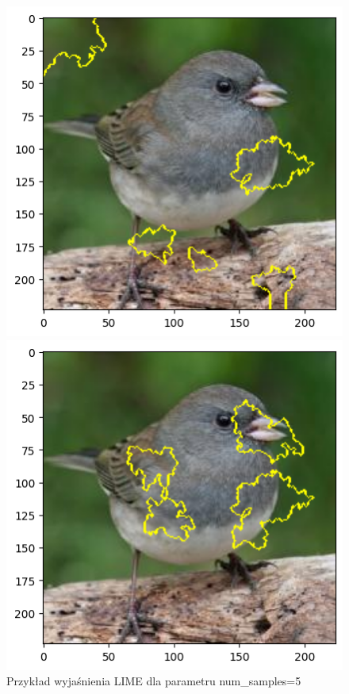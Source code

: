 \begin{figure}
	\centering
	\begin{minipage}[b]{0.3\textwidth}
		\includegraphics[width=.9\textwidth]{img/parameters/lime/num_samples_5}
		\caption{Przykład wyjaśnienia LIME dla parametru num\_samples=5}  \label{rys:parameters_lime_numsamples_5}
	\end{minipage}
	\begin{minipage}[b]{0.3\textwidth}
		\centering\includegraphics[width=.9\textwidth]{img/parameters/lime/num_samples_1000}

\end{minipage}
\end{figure}

